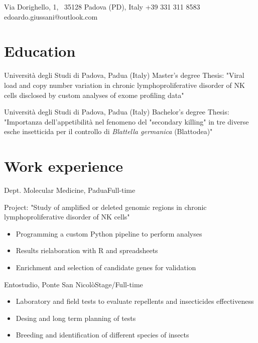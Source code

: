 \documentclass{fancy_cv}
\author{Edoardo Giussani}
\begin{document}
    {Via Dorighello, 1, \ 35128 Padova (PD), Italy}
    {+39 331 311 8583}
    {edoardo.giussani@outlook.com}

    \section{Education}
            {Università degli Studi di Padova, Padua (Italy)} {Master's degree}
            {%
            Thesis: "Viral load and copy number variation in chronic 
            lymphoproliferative disorder of NK cells disclosed by custom analyses
            of exome profiling data"}
        \medskip

            {Università degli Studi di Padova, Padua (Italy)} {Bachelor's degree}
            {%
            Thesis: "Importanza dell'appetibilità nel fenomeno del "secondary 
            killing" in tre diverse esche insetticida per il controllo
            di \textit{Blattella germanica} (Blattodea)"}


    \section{Work experience}
            {Dept. Molecular Medicine, Padua}{Full-time}
            {Project: "Study of amplified or deleted genomic regions in chronic 
            lymphoproliferative disorder of NK cells"
            \begin{itemize}
                \item Programming a custom Python pipeline to perform analyses
                \item Results rielaboration with R and spreadsheets
                \item Enrichment and selection of candidate genes for validation 
            \end{itemize}}
        \medskip

            {Entostudio, Ponte San Nicolò}{Stage/Full-time}
            {\begin{itemize}
                \item Laboratory and field tests to evaluate repellents and insecticides effectiveness 
                \item Desing and long term planning of tests
                \item Breeding and identification of different species of insects
            \end{itemize}}
\end{document}
